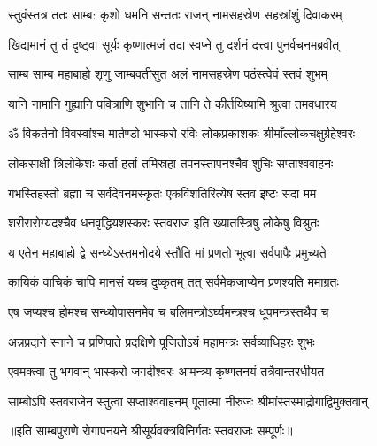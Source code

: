 


\twolineshloka
{स्तुवंस्तत्र ततः साम्ब: कृशो धमनि सन्ततः}
{राजन् नामसहस्रेण सहस्रांशुं दिवाकरम्} %

\twolineshloka
{खिद्यमानं तु तं दृष्ट्वा सूर्यः कृष्णात्मजं तदा}
{स्वप्ने तु दर्शनं दत्त्वा पुनर्वचनमब्रवीत्} %


\twolineshloka
{साम्ब साम्ब महाबाहो शृणु जाम्बवतीसुत}
{अलं नामसहस्रेण पठंस्त्वेवं स्तवं शुभम्} %

\twolineshloka
{यानि नामानि गुह्यानि पवित्राणि शुभानि च}
{तानि ते कीर्तयिष्यामि श्रुत्वा तमवधारय} %

\twolineshloka
{ॐ विकर्तनो विवस्वांश्च मार्तण्डो भास्करो रविः}
{लोकप्रकाशकः श्रीमाँल्लोकचक्षुर्ग्रहेश्वरः} %

\twolineshloka
{लोकसाक्षी त्रिलोकेशः कर्ता हर्ता तमिस्रहा}
{तपनस्तापनश्चैव शुचिः सप्ताश्ववाहनः} %

\twolineshloka
{गभस्तिहस्तो ब्रह्मा च सर्वदेवनमस्कृतः}
{एकविंशतिरित्येष स्तव इष्टः सदा मम} %

\twolineshloka
{शरीरारोग्यदश्चैव धनवृद्धियशस्करः}
{स्तवराज इति ख्यातस्त्रिषु लोकेषु विश्रुतः} %

\twolineshloka
{य एतेन महाबाहो द्वे सन्ध्येऽस्तमनोदये}
{स्तौति मां प्रणतो भूत्वा सर्वपापैः प्रमुच्यते} %

\twolineshloka
{कायिकं वाचिकं चापि मानसं यच्च दुष्कृतम्}
{तत् सर्वमेकजाप्येन प्रणश्यति ममाग्रतः} %

\twolineshloka
{एष जप्यश्च होमश्च सन्ध्योपासनमेव च}
{बलिमन्त्रोऽर्घ्यमन्त्रश्च धूपमन्त्रस्तथैव च} %

\twolineshloka
{अन्नप्रदाने स्नाने च प्रणिपाते प्रदक्षिणे}
{पूजितोऽयं महामन्त्रः सर्वव्याधिहरः शुभः} %

\twolineshloka
{एवमक्त्वा तु भगवान् भास्करो जगदीश्वरः}
{आमन्त्र्य कृष्णतनयं तत्रैवान्तरधीयत} %

\twolineshloka
{साम्बोऽपि स्तवराजेन स्तुत्वा सप्ताश्ववाहनम्}
{पूतात्मा नीरुजः श्रीमांस्तस्माद्रोगाद्विमुक्तवान्} %


॥इति साम्बपुराणे रोगापनयने श्रीसूर्यवक्त्रविनिर्गतः स्तवराजः सम्पूर्णः॥